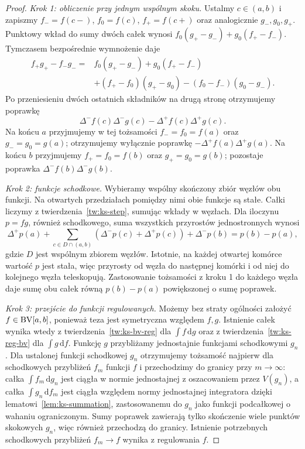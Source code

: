 \begin{proof}
\emph{Krok 1: obliczenie przy jednym wspólnym skoku.} Ustalmy $c\in(a,b)$ i zapiszmy $f_-=f(c-)$, $f_0=f(c)$, $f_+=f(c+)$ oraz analogicznie $g_-,g_0,g_+$. Punktowy wkład do sumy dwóch całek wynosi $f_0(g_+-g_-)+g_0(f_+-f_-)$. Tymczasem bezpośrednie wymnożenie daje
\[
 \begin{aligned}
 f_+g_+-f_-g_-={}&f_0(g_+-g_-)+g_0(f_+-f_-)\\
 &+(f_+-f_0)(g_+-g_0)-(f_0-f_-)(g_0-g_-).
 \end{aligned}
\]
Po przeniesieniu dwóch ostatnich składników na drugą stronę otrzymujemy poprawkę
\[
 \Delta^-f(c)\Delta^-g(c)-\Delta^+f(c)\Delta^+g(c).
\] Na końcu $a$ przyjmujemy w tej tożsamości $f_-=f_0=f(a)$ oraz $g_-=g_0=g(a)$; otrzymujemy wyłącznie poprawkę $-\Delta^+f(a)\Delta^+g(a)$. Na końcu $b$ przyjmujemy $f_+=f_0=f(b)$ oraz $g_+=g_0=g(b)$; pozostaje poprawka $\Delta^-f(b)\Delta^-g(b)$.

\emph{Krok 2: funkcje schodkowe.} Wybieramy wspólny skończony zbiór węzłów obu funkcji. Na otwartych przedziałach pomiędzy nimi obie funkcje są stałe. Całki liczymy z twierdzenia~\ref{tw:ks-step}, sumując wkłady w węzłach. Dla iloczynu $p=fg$, również schodkowego, suma wszystkich przyrostów jednostronnych wynosi
\[
 \Delta^+p(a)+\sum_{c\in D\cap(a,b)}
 (\Delta^-p(c)+\Delta^+p(c))+\Delta^-p(b)
 =p(b)-p(a),
\]
gdzie $D$ jest wspólnym zbiorem węzłów. Istotnie, na każdej otwartej komórce wartość $p$ jest stała, więc przyrosty od węzła do następnej komórki i od niej do kolejnego węzła teleskopują. Zastosowanie tożsamości z kroku 1 do każdego węzła daje sumę obu całek równą $p(b)-p(a)$ powiększonej o sumę poprawek.

\emph{Krok 3: przejście do funkcji regulowanych.} Możemy bez straty ogólności założyć $f\in\mathrm{BV}[a,b]$, ponieważ teza jest symetryczna względem $f,g$. Istnienie całek wynika wtedy z twierdzenia~\ref{tw:ks-bv-reg} dla $\int f\,\mathrm dg$ oraz z twierdzenia~\ref{tw:ks-reg-bv} dla $\int g\,\mathrm df$. Funkcję $g$ przybliżamy jednostajnie funkcjami schodkowymi $g_n$. Dla ustalonej funkcji schodkowej $g_n$ otrzymujemy tożsamość najpierw dla schodkowych przybliżeń $f_m$ funkcji $f$ i przechodzimy do granicy przy $m\to\infty$: całka $\int f_m\,\mathrm dg_n$ jest ciągła w normie jednostajnej z oszacowaniem przez $V(g_n)$, a całka $\int g_n\,\mathrm df_m$ jest ciągła względem normy jednostajnej integratora dzięki lematowi~\ref{lem:ks-summation}, zastosowanemu do $g_n$ jako funkcji podcałkowej o wahaniu ograniczonym. Sumy poprawek zawierają tylko skończenie wiele punktów skokowych $g_n$, więc również przechodzą do granicy. Istnienie potrzebnych schodkowych przybliżeń $f_m\to f$ wynika z regulowania $f$.


\end{proof}
